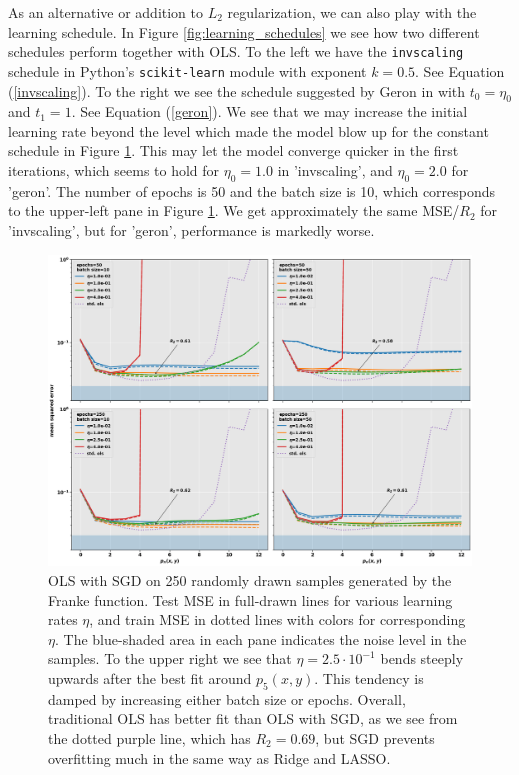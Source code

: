 \documentclass[]{article}
\begin{document}
As an alternative or addition to $L_2$ regularization, we can also play with the learning schedule. In Figure \ref{fig:learning_schedules} we see how two different schedules perform together with OLS. To the left we have the \lstinline|invscaling| schedule in Python's \lstinline|scikit-learn| module \cite{skl} with exponent $k=0.5$. See Equation (\ref{invscaling}). To the right we see the schedule suggested by Geron in \cite{geron2019hands} with $t_0 = \eta_0$ and $t_1 = 1$. See Equation (\ref{geron}). We see that we may increase the initial learning rate beyond the level which made the model blow up for the constant schedule in Figure \ref{fig:ols_sgd}. This may let the model converge quicker in the first iterations, which seems to hold for $\eta_0 = 1.0$ in 'invscaling', and $\eta_0 = 2.0$ for 'geron'. The number of epochs is 50 and the batch size is 10, which corresponds to the upper-left pane in Figure \ref{fig:ols_sgd}. We get approximately the same MSE/$R_2$ for 'invscaling', but for 'geron', performance is markedly worse.

\begin{figure}[!htb]
	\centering
	\includegraphics[width=1\linewidth]{ols_sgd.png}
	\caption{OLS with SGD on 250 randomly drawn samples generated by the Franke function. Test MSE in full-drawn lines for various learning rates $\eta$, and train MSE in dotted lines with colors for corresponding $\eta$. The blue-shaded area in each pane indicates the noise level in the samples. To the upper right we see that $\eta = 2.5 \cdot 10^{-1}$ bends steeply upwards after the best fit around $p_5(x,y)$. This tendency is damped by increasing either batch size or epochs. Overall, traditional OLS has better fit than OLS with SGD, as we see from the dotted purple line, which has $R_2 = 0.69$, but SGD prevents overfitting much in the same way as Ridge and LASSO.}
	\label{fig:ols_sgd}
\end{figure}
\end{document}

